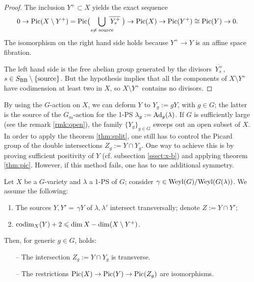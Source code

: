 \documentclass[11pt,reqno]{amsart}
\let\ovl\overline
\numberwithin{equation}{section}
\numberwithin{figure}{section}
\let\l\lambda
\let\sm\setminus
\let\les\leqslant
\begin{document}
\begin{proof} 
The inclusion $Y^+\subset X$ yields the exact sequence 
\begin{equation}\label{eq:picY}
0\to{\mathop{\rm Pic}\nolimits}(X\sm Y^+)
={\mathop{\rm Pic}\nolimits}\big(\underset{s\neq\;{\rm source}}{\bigcup}\kern-1.5ex\ovl{\,Y_s^+}\;\big)
\to{\mathop{\rm Pic}\nolimits}(X)\to{\mathop{\rm Pic}\nolimits}(Y^+)\cong{\mathop{\rm Pic}\nolimits}(Y)\to 0.
\end{equation}
The isomorphism on the right hand side holds because $Y^+\to Y$ is an affine space 
fibration. 

The left hand side is the free abelian group generated by the divisors  
$\ovl{\,Y_s^+\!}$, $s\in S_{{\rm BB}}\sm\{\rm source\}$. 
But the hypothesis implies that all the components of $X\sm Y^+$ have codimension 
at least two in $X$, so $X\sm Y^+$ contains no divisors. 
\end{proof}

By using the $G$-action on $X$, we can deform $Y$ to $Y_g:=gY$, with $g\in G$; 
the latter is the source of the $G_m$-action for the 1-PS $\l_g:={{\rm Ad}}_g(\l)$. 
If $G$ is sufficiently large (see the remark \ref{rmk:open}), 
the family $\{Y_g\}_{g\in G}$ sweeps out an open subset of $X$. 
In order to apply the theorem \ref{thm:split}, one still has to control 
the Picard group of the double intersections $Z_g:=Y\cap Y_g$. 
One way to achieve this is by proving sufficient positivity of $Y$ 
(cf. subsection \ref{sssct:x-b}) and applying theorem \ref{thm:pic}. 
However, if this method fails, one has to use additional symmetry. 

\begin{m-corollary}\label{cor:gm2}
Let $X$ be a $G$-variety and $\l$ a 1-PS of $G$; consider $\gamma\in{\mathop{\rm{Weyl}}\nolimits}(G)/{\mathop{\rm{Weyl}}\nolimits}(G(\l))$. We assume the following: 
\begin{enumerate}
\item 
The sources $Y,Y'{=}\,\gamma Y$ of $\l,\l'$ intersect transversally; 
denote $Z:=Y\cap Y'$; 
\item 
${{\rm codim}}_X(Y)+2\les\dim X-\dim(X\sm Y^+)$.
\end{enumerate}
Then, for generic $g\in G$, holds: 
\begin{enumerate}
\item[--] 
The intersection $Z_g:=Y\cap Y_g$ is transverse.
\item[--] 
The restrictions ${\mathop{\rm Pic}\nolimits}(X)\to{\mathop{\rm Pic}\nolimits}(Y)\to{\mathop{\rm Pic}\nolimits}(Z_g)$ are isomorphisms.
\end{enumerate}
\end{m-corollary}
\end{document}
